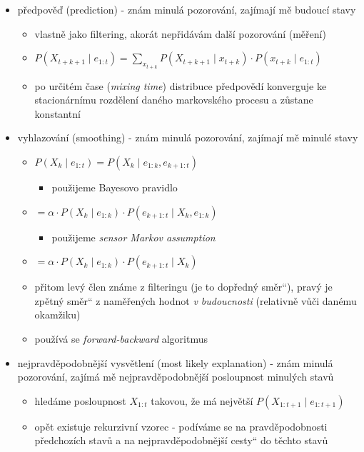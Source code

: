 \begin{itemize}
\begin{itemize}
\begin{itemize}
\begin{itemize}
\end{itemize}
\item předpověď (prediction) - znám minulá pozorování, zajímají mě budoucí stavy
\begin{itemize}
\item vlastně jako filtering, akorát nepřidávám další pozorování (měření)
\item $P(X_{t+k+1}\mid e_{1:t})=\sum_{x_{t+k}} P(X_{t+k+1}\mid x_{t+k})\cdot P(x_{t+k}\mid e_{1:t})$
\item po určitém čase (\textit{mixing time}) distribuce předpovědí konverguje ke stacionárnímu rozdělení daného markovského procesu a zůstane konstantní
\end{itemize}
\item vyhlazování (smoothing) - znám minulá pozorování, zajímají mě minulé stavy
\begin{itemize}
\item $P(X_k\mid e_{1:t})=P(X_k\mid e_{1:k},e_{k+1:t})$
\begin{itemize}
\item použijeme Bayesovo pravidlo
\end{itemize}
\item $=\alpha\cdot P(X_k\mid e_{1:k})\cdot P(e_{k+1:t}\mid X_k,e_{1:k})$
\begin{itemize}
\item použijeme \textit{sensor Markov assumption}
\end{itemize}
\item $=\alpha\cdot P(X_k\mid e_{1:k})\cdot P(e_{k+1:t}\mid X_k)$
\item přitom levý člen známe z filteringu (je to \quotedblbase{}dopředný směr\textquotedblleft{}), pravý je \quotedblbase{}zpětný směr\textquotedblleft{} z naměřených hodnot \textit{v budoucnosti} (relativně vůči danému okamžiku)
\item používá se \textit{forward-backward} algoritmus
\end{itemize}
\item nejpravděpodobnější vysvětlení (most likely explanation) - znám minulá pozorování, zajímá mě nejpravděpodobnější posloupnost minulých stavů
\begin{itemize}
\item hledáme posloupnost $X_{1:t}$ takovou, že má největší $P(X_{1:t+1}\mid e_{1:t+1})$
\item opět existuje rekurzivní vzorec - podíváme se na pravděpodobnosti předchozích stavů a na nejpravděpodobnější \quotedblbase{}cesty\textquotedblleft{} do těchto stavů

\end{itemize}
\end{itemize}
\end{itemize}
\end{itemize}
